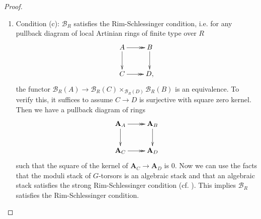 \documentclass[10pt]{article}
\numberwithin{equation}{section}
\newcommand{\bZ}{{\mathbb Z}}
\newcommand{\calB}{{\mathcal B}}
\newcommand{\calE}{{\mathcal E}}
\newcommand{\Rep}{{\mathrm{Rep}}}           %
\newcommand{\Sym}{{\mathrm{Sym}}}           %
\newcommand{\bfA}{{\textbf{A}}}
\begin{document}
\begin{proof}
\begin{enumerate}
      
    
    \item Condition (c): $\calB_R$ satisfies the Rim-Schlessinger condition, i.e. for any pullback diagram of local Artinian rings of finite type over $R$
    \begin{equation*}
        \xymatrix{
        A\ar@{->>}[r]\ar[d]& B\ar[d]\\
        C\ar@{->>}[r]& D,
        }
    \end{equation*}
    the functor $\calB_R(A)\to \calB_R(C)\times_{\calB_R(D)}\calB_R(B)$ is an equivalence. To verify this, it suffices to assume $C\to D$ is surjective with square zero kernel. Then we have a pullback diagram of  rings 
    \begin{equation*}
        \xymatrix{
        \bfA_A\ar@{->>}[r]\ar[d]& \bfA_B\ar[d]\\
        \bfA_C\ar@{->>}[r]& \bfA_D
        }
    \end{equation*}
    such that the square of the kernel of $\bfA_C\to \bfA_D$ is $0$. Now we can use the facts that the moduli stack of $G$-torsors is an algebraic stack and that an algebraic stack satisfies the strong Rim-Schlessinger condition (cf. \cite[\href{https://stacks.math.columbia.edu/tag/0CXP}{Tag 0CXP}]{stacks-project}). This implies $\calB_R$ satisfies the Rim-Schlessinger condition.


  

    

    
    
    



\end{enumerate}
\end{proof}
\end{document}
